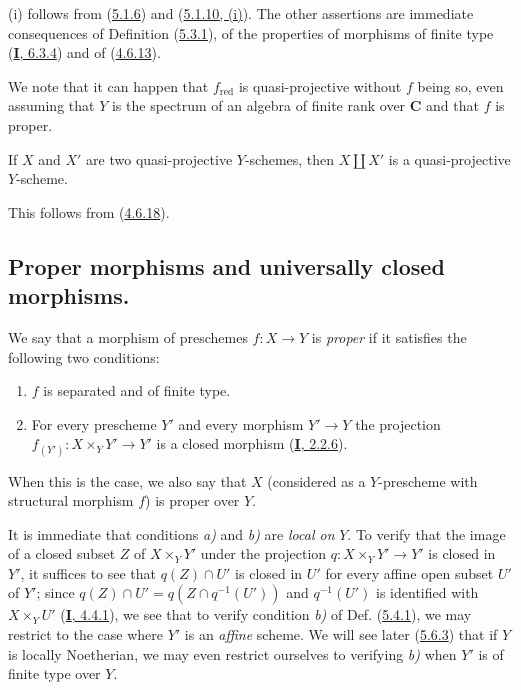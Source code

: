 (i) follows from (\hyperref[II.5.1.6]{5.1.6}) and
(\hyperref[II.5.1.10]{5.1.10, (i)}). The other assertions are immediate
consequences of Definition (\hyperref[II.5.3.1]{5.3.1}), of the properties
of morphisms of finite type (\hyperref[I.6.3.4]{\textbf{I}, 6.3.4}) and of
(\hyperref[II.4.6.13]{4.6.13}).

\begin{remark}[5.3.5]
\label{II.5.3.5}
We note that it can happen that $f_{\mathrm{red}}$ is quasi-projective
without $f$ being so, even assuming that $Y$ is the spectrum of an algebra
of finite rank over $\mathbf{C}$ and that $f$ is proper.
\end{remark}

\begin{corollary}[5.3.6]
\label{II.5.3.6}
If $X$ and $X'$ are two quasi-projective $Y$-schemes, then $X\amalg X'$ is a
quasi-projective $Y$-scheme.
\end{corollary}

This follows from (\hyperref[II.4.6.18]{4.6.18}).

\subsection{Proper morphisms and universally closed morphisms.}
\label{subsection:II.5.4}
\label{II.5.4}

\begin{definition}[5.4.1]
\label{II.5.4.1}
We say that a morphism of preschemes $f:X\to Y$ is \emph{proper} if it
satisfies the following two conditions:
\begin{enumerate}
  \item[\rm{a)}] $f$ is separated and of finite type.
  \item[\rm{b)}] For every prescheme $Y'$ and every morphism $Y'\to Y$ the
  projection $f_{(Y')}:X\times_YY'\to Y'$ is a closed morphism
  (\hyperref[I.2.2.6]{\textbf{I}, 2.2.6}).
\end{enumerate}
When this is the case, we also say that $X$ (considered as a $Y$-prescheme
with structural morphism $f$) is proper over $Y$.
\end{definition}

It is immediate that conditions \emph{a)} and \emph{b)} are \emph{local on} $Y$. To verify
that the image of a closed subset $Z$ of $X\times_YY'$ under the
projection $q:X\times_YY'\to Y'$ is closed in $Y'$, it suffices to see that
$q(Z)\cap U'$ is closed in $U'$ for every affine open subset $U'$ of $Y'$;
since $q(Z)\cap U'=q(Z\cap q^{-1}(U'))$ and $q^{-1}(U')$ is identified with
$X\times_YU'$ (\hyperref[I.4.4.1]{\textbf{I}, 4.4.1}), we see that to verify
condition \emph{b)} of Def. (\hyperref[II.5.4.1]{5.4.1}), we may restrict to the
case where $Y'$ is an \emph{affine} scheme. We will see later
(\hyperref[II.5.6.3]{5.6.3}) that if $Y$ is locally Noetherian, we
may even restrict ourselves to verifying \emph{b)} when $Y'$ is of finite type over $Y$.

